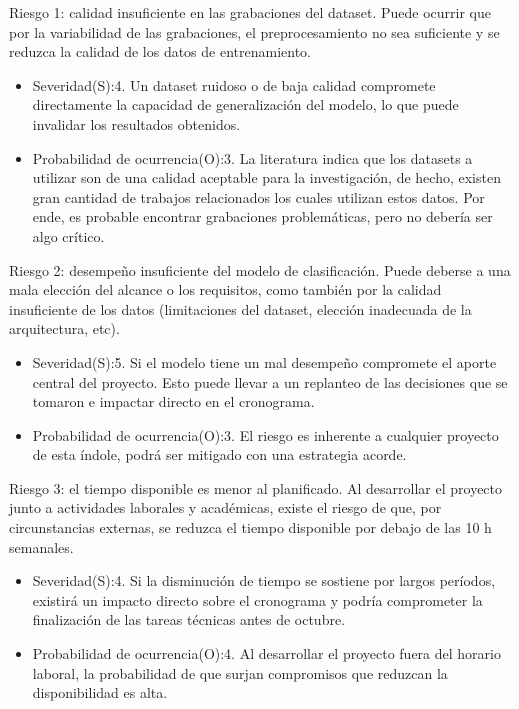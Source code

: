 \documentclass[
11pt, %
]{charter}
\begin{document}
Riesgo 1: calidad insuficiente en las grabaciones del dataset. Puede ocurrir que por la variabilidad de las grabaciones, el preprocesamiento no sea 
suficiente y se reduzca la calidad de los datos de entrenamiento.
\begin{itemize}
  \item Severidad(S):4. Un dataset ruidoso o de baja calidad compromete directamente la capacidad de generalización del modelo, lo que puede 
  invalidar los resultados obtenidos.
  \item Probabilidad de ocurrencia(O):3. La literatura indica que los datasets a utilizar son de una calidad aceptable para la investigación, de hecho,
  existen gran cantidad de trabajos relacionados los cuales utilizan estos datos. Por ende, es probable encontrar grabaciones problemáticas, pero no 
  debería ser algo crítico.
\end{itemize}

Riesgo 2: desempeño insuficiente del modelo de clasificación. Puede deberse a una mala elección del alcance o los requisitos, como
también por la calidad insuficiente de los datos (limitaciones del dataset, elección inadecuada de la arquitectura, etc).
\begin{itemize}
  \item Severidad(S):5. Si el modelo tiene un mal desempeño compromete el aporte central del proyecto. Esto puede llevar a un replanteo de las decisiones
  que se tomaron e impactar directo en el cronograma.
  \item Probabilidad de ocurrencia(O):3. El riesgo es inherente a cualquier proyecto de esta índole, podrá ser mitigado con una estrategia acorde.
\end{itemize}

Riesgo 3: el tiempo disponible es menor al planificado. Al desarrollar el proyecto junto a actividades laborales y académicas, existe el riesgo de
que, por circunstancias externas, se reduzca el tiempo disponible por debajo de las 10 h semanales.
\begin{itemize}
  \item Severidad(S):4. Si la disminución de tiempo se sostiene por largos períodos, existirá un impacto directo sobre el cronograma y podría comprometer
  la finalización de las tareas técnicas antes de octubre.
  \item Probabilidad de ocurrencia(O):4. Al desarrollar el proyecto fuera del horario laboral, la probabilidad de que surjan compromisos que reduzcan la
  disponibilidad es alta.
\end{itemize}
\end{document}
